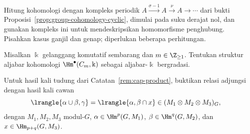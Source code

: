 \begin{Exercises}
	\begin{hint}
		Hitung kohomologi dengan kompleks periodik
		$A\xrightarrow{\sigma-1}A\xrightarrow{\nu}A\to\cdots$ dari bukti
		Proposisi~\ref{prop:group-cohomology-cyclic}, dimulai pada suku derajat
		nol, dan gunakan kompleks ini untuk mendeskripsikan homomorfisme
		penghubung. Pisahkan kasus ganjil dan genap; diperlukan beberapa
		perhitungan.
	\end{hint}

	\item Misalkan $\Bbbk$ gelanggang komutatif sembarang dan
	$m\in\Z_{\geq1}$. Tentukan struktur aljabar kohomologi
	$\Hm^\bullet(C_m,\Bbbk)$ sebagai aljabar-$\Bbbk$ bergradasi.

	\item Untuk hasil kali tudung dari Catatan~\ref{rem:cap-product}, buktikan
	relasi adjungsi dengan hasil kali cawan
	\[ \lrangle{\alpha\cup\beta,\gamma}
	=\lrangle{\alpha,\beta\cap x}\in(M_1\otimes M_2\otimes M_3)_G, \]
	dengan $M_1,M_2,M_3$ modul-$G$,
	$\alpha\in\Hm^p(G,M_1)$, $\beta\in\Hm^q(G,M_2)$, dan
	$x\in\Hm_{p+q}(G,M_3)$.


\end{Exercises}
